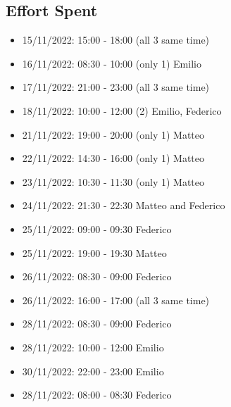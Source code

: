 \subsection{Effort Spent}
\begin{itemize}
    \item 15/11/2022: 15:00 - 18:00 (all 3 same time)
    \item 16/11/2022: 08:30 - 10:00 (only 1) Emilio
    \item 17/11/2022: 21:00 - 23:00 (all 3 same time)
    \item 18/11/2022: 10:00 - 12:00 (2) Emilio, Federico
    \item 21/11/2022: 19:00 - 20:00 (only 1) Matteo
    \item 22/11/2022: 14:30 - 16:00 (only 1) Matteo
    \item 23/11/2022: 10:30 - 11:30 (only 1) Matteo
    \item 24/11/2022: 21:30 - 22:30 Matteo and Federico
    \item 25/11/2022: 09:00 - 09:30 Federico
    \item 25/11/2022: 19:00 - 19:30 Matteo
    \item 26/11/2022: 08:30 - 09:00 Federico
    \item 26/11/2022: 16:00 - 17:00 (all 3 same time)
    \item 28/11/2022: 08:30 - 09:00 Federico
    \item 28/11/2022: 10:00 - 12:00 Emilio
    \item 30/11/2022: 22:00 - 23:00 Emilio
    \item 28/11/2022: 08:00 - 08:30 Federico
\end{itemize}